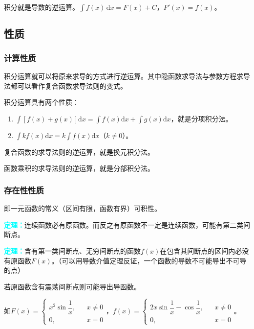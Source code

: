 \documentclass[UTF8, 12pt]{ctexart}
\begin{document}
        积分就是导数的逆运算。$\int f(x)\,\textrm{d}x=F(x)+C$，$F'(x)=f(x)$。

        \subsection{性质}

        \subsubsection{计算性质}

        积分运算就可以将原来求导的方式进行逆运算。其中隐函数求导法与参数方程求导法都可以看作复合函数求导法则的变式。

        积分运算具有两个性质：

        \begin{enumerate}
            \item $\int[f(x)+g(x)]\textrm{d}x=\int f(x)\textrm{d}x+\int g(x)\textrm{d}x$，就是分项积分法。
            \item $\int kf(x)\textrm{d}x=k\int f(x)\textrm{d}x$（$k\neq 0$）。
        \end{enumerate}

        复合函数的求导法则的逆运算，就是换元积分法。

        函数乘积的求导法则的逆运算，就是分部积分法。

        \subsubsection{存在性性质}

        即一元函数的常义（区间有限，函数有界）可积性。

        \textcolor{aqua}{\textbf{定理：}}连续函数必有原函数。而反之有原函数不一定是连续函数，可能有第二类间断点。

        \textcolor{aqua}{\textbf{定理：}}含有第一类间断点、无穷间断点的函数$f(x)$在包含其间断点的区间内必没有原函数$F(x)$。（可以用导数介值定理反证，一个函数的导数不可能导出不可导的点）

        若原函数含有震荡间断点则可能导出导函数。

        如$F(x)=\left\{\begin{array}{lcl}
                           x^2\sin\dfrac{1}{x}, & & x\neq 0 \\
                           0, & & x=0
        \end{array}\right.$，$f(x)=\left\{\begin{array}{lcl}
                                             2x\sin\dfrac{1}{x}-\cos\dfrac{1}{x}, & & x\neq 0 \\
                                             0, & & x=0
        \end{array}\right.$。
\end{document}
